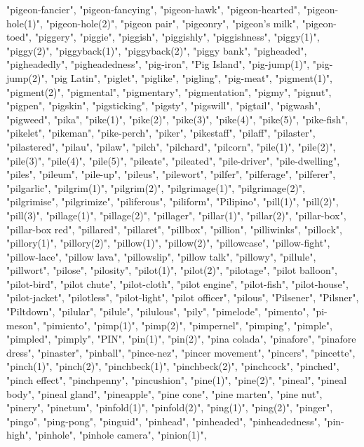 "pigeon-fancier",
"pigeon-fancying",
"pigeon-hawk",
"pigeon-hearted",
"pigeon-hole(1)",
"pigeon-hole(2)",
"pigeon pair",
"pigeonry",
"pigeon's milk",
"pigeon-toed",
"piggery",
"piggie",
"piggish",
"piggishly",
"piggishness",
"piggy(1)",
"piggy(2)",
"piggyback(1)",
"piggyback(2)",
"piggy bank",
"pigheaded",
"pigheadedly",
"pigheadedness",
"pig-iron",
"Pig Island",
"pig-jump(1)",
"pig-jump(2)",
"pig Latin",
"piglet",
"piglike",
"pigling",
"pig-meat",
"pigment(1)",
"pigment(2)",
"pigmental",
"pigmentary",
"pigmentation",
"pigmy",
"pignut",
"pigpen",
"pigskin",
"pigsticking",
"pigsty",
"pigswill",
"pigtail",
"pigwash",
"pigweed",
"pika",
"pike(1)",
"pike(2)",
"pike(3)",
"pike(4)",
"pike(5)",
"pike-fish",
"pikelet",
"pikeman",
"pike-perch",
"piker",
"pikestaff",
"pilaff",
"pilaster",
"pilastered",
"pilau",
"pilaw",
"pilch",
"pilchard",
"pilcorn",
"pile(1)",
"pile(2)",
"pile(3)",
"pile(4)",
"pile(5)",
"pileate",
"pileated",
"pile-driver",
"pile-dwelling",
"piles",
"pileum",
"pile-up",
"pileus",
"pilewort",
"pilfer",
"pilferage",
"pilferer",
"pilgarlic",
"pilgrim(1)",
"pilgrim(2)",
"pilgrimage(1)",
"pilgrimage(2)",
"pilgrimise",
"pilgrimize",
"piliferous",
"piliform",
"Pilipino",
"pill(1)",
"pill(2)",
"pill(3)",
"pillage(1)",
"pillage(2)",
"pillager",
"pillar(1)",
"pillar(2)",
"pillar-box",
"pillar-box red",
"pillared",
"pillaret",
"pillbox",
"pillion",
"pilliwinks",
"pillock",
"pillory(1)",
"pillory(2)",
"pillow(1)",
"pillow(2)",
"pillowcase",
"pillow-fight",
"pillow-lace",
"pillow lava",
"pillowslip",
"pillow talk",
"pillowy",
"pillule",
"pillwort",
"pilose",
"pilosity",
"pilot(1)",
"pilot(2)",
"pilotage",
"pilot balloon",
"pilot-bird",
"pilot chute",
"pilot-cloth",
"pilot engine",
"pilot-fish",
"pilot-house",
"pilot-jacket",
"pilotless",
"pilot-light",
"pilot officer",
"pilous",
"Pilsener",
"Pilsner",
"Piltdown",
"pilular",
"pilule",
"pilulous",
"pily",
"pimelode",
"pimento",
"pi-meson",
"pimiento",
"pimp(1)",
"pimp(2)",
"pimpernel",
"pimping",
"pimple",
"pimpled",
"pimply",
"PIN",
"pin(1)",
"pin(2)",
"pina colada",
"pinafore",
"pinafore dress",
"pinaster",
"pinball",
"pince-nez",
"pincer movement",
"pincers",
"pincette",
"pinch(1)",
"pinch(2)",
"pinchbeck(1)",
"pinchbeck(2)",
"pinchcock",
"pinched",
"pinch effect",
"pinchpenny",
"pincushion",
"pine(1)",
"pine(2)",
"pineal",
"pineal body",
"pineal gland",
"pineapple",
"pine cone",
"pine marten",
"pine nut",
"pinery",
"pinetum",
"pinfold(1)",
"pinfold(2)",
"ping(1)",
"ping(2)",
"pinger",
"pingo",
"ping-pong",
"pinguid",
"pinhead",
"pinheaded",
"pinheadedness",
"pin-high",
"pinhole",
"pinhole camera",
"pinion(1)",
